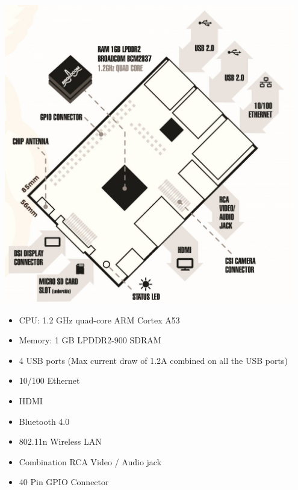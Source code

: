\documentclass{article}
\begin{document}
	\begin{minipage}{0.5\textwidth}
		
		\includegraphics[width=0.95\textwidth]{pics/Raspberry-Pi-3_Block_Diagram.jpg}
		
	
	\end{minipage}
	\begin{minipage}{0.45\textwidth}
		
		\begin{itemize}
			\item CPU: 1.2 GHz quad-core ARM Cortex A53
			\item Memory: 1 GB LPDDR2-900 SDRAM
			\item 4 USB ports (Max current draw of 1.2A combined on all the USB ports)
			\item 10/100 Ethernet
			\item HDMI
			\item Bluetooth 4.0
			\item 802.11n Wireless LAN
			\item Combination RCA Video / Audio jack
			\item 40 Pin GPIO Connector
		\end{itemize}
	
	\end{minipage}
\end{document}
